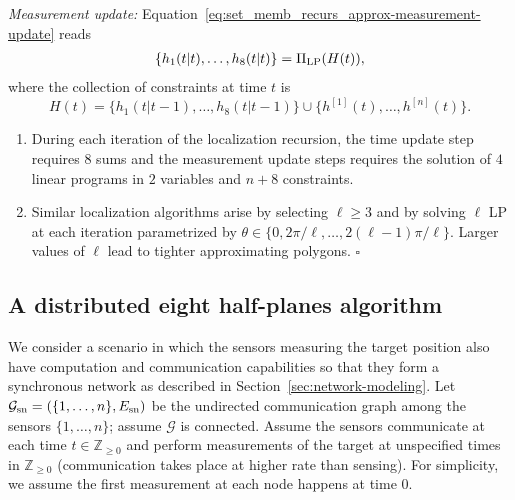 \documentclass[onecolumn,journal,letterpaper]{IEEEtran}
\newcommand{\integernonnegative}{{\mathbb{Z}_{\geq0}}}
\newcommand{\subscr}[2]{{#1}_{\textup{#2}}}
\newcommand{\union}{\cup}
\newcommand{\GG}{\mathcal{G}}
\newcommand{\until}[1]{\{1,\dots,#1\}}
\newcommand{\supind}[2]{{#1}^{[#2]}}
\newcommand\oprocendsymbol{\hbox{$\square$}}
\newcommand\oprocend{\relax\ifmmode\else\unskip\hfill\fi\oprocendsymbol}
\newcommand{\PiLP}{\Pi_{\textup{LP}}}
\begin{document}
\smallskip
\noindent\emph{Measurement update:}
Equation~\eqref{eq:set_memb_recurs_approx-measurement-update} reads
\begin{gather*}
  \{h_1(t|t),\dots,h_8(t|t)\} = \PiLP(H(t)),
\end{gather*}
where the collection of constraints at time $t$ is
\begin{equation*}
  H(t) = \{h_1(t|t-1),\dots,h_8(t|t-1)\}\union
  \{\supind{h}{1}(t),\dots,\supind{h}{n}(t)\}.
\end{equation*}

\begin{remark}
  \begin{enumerate}
  \item During each iteration of the localization recursion, the time
    update step requires $8$ sums and the measurement update steps requires
    the solution of $4$ linear programs in $2$ variables and $n+8$
    constraints.

  \item Similar localization algorithms arise by selecting $\ell\geq3$ and
    by solving $\ell$ LP at each iteration parametrized by $\theta\in
    \{0,2\pi/\ell,\dots,2(\ell-1)\pi/\ell\}$. Larger values of $\ell$ lead
    to tighter approximating polygons. \oprocend

  \end{enumerate}
\end{remark}


\subsection{A distributed eight half-planes algorithm}
We consider a scenario in which the sensors measuring the target position
also have computation and communication capabilities so that they form a
synchronous network as described in Section~\ref{sec:network-modeling}.
Let $\subscr{\GG}{sn} = (\until{n}, \subscr{E}{sn})$ be the undirected
communication graph among the sensors $\until{n}$; assume $\GG$ is
connected.
Assume the sensors communicate at each time $t\in\integernonnegative$ and
perform measurements of the target at unspecified times in
$\integernonnegative$ (communication takes place at higher rate than
sensing). For simplicity, we assume the first measurement at each node
happens at time $0$.
\end{document}
